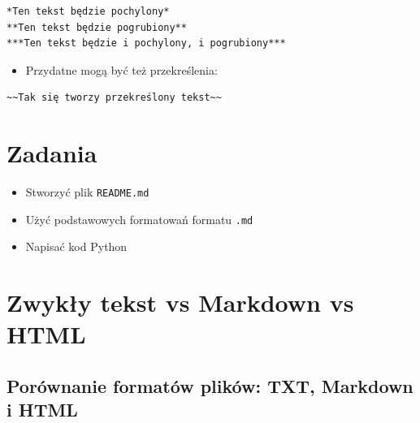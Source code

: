 \documentclass[12pt, a4paper]{article}
\newcommand{\cmark}{\textcolor{green!60!black}{\ding{51}}}
\begin{document}
\begin{lstlisting}[caption=Formatowanie tekstu]
*Ten tekst będzie pochylony*
**Ten tekst będzie pogrubiony**
***Ten tekst będzie i pochylony, i pogrubiony***
\end{lstlisting}

\begin{itemize}
    \item Przydatne mogą być też przekreślenia:
\end{itemize}

\begin{lstlisting}[caption=Przekreślenie]
~~Tak się tworzy przekreślony tekst~~
\end{lstlisting}

\section{Zadania}
\begin{itemize}
    \item[\cmark] Stworzyć plik \texttt{README.md}
    \item[$\square$] Użyć podstawowych formatowań formatu \texttt{.md}
    \item[$\square$] Napisać kod Python
\end{itemize}

\section{Zwykły tekst vs Markdown vs HTML}

\subsection{Porównanie formatów plików: TXT, Markdown i HTML}
\end{document}
